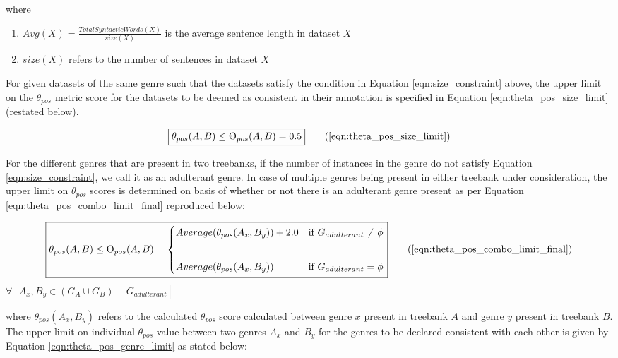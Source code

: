  where

\begin{enumerate}
    \item $Avg(X) = \frac{Total Syntactic Words(X)}{size(X)}$ is the average sentence length in dataset $X$
    \item $size(X)$ refers to the number of sentences in dataset $X$
\end{enumerate}

For given datasets of the same genre such that the datasets satisfy the condition in Equation \ref{eqn:size_constraint} above, the upper limit on the $\theta_{pos}$ metric score for the datasets to be deemed as consistent in their annotation is specified in Equation \ref{eqn:theta_pos_size_limit} (restated below).

\begin{equation}
\boxed{\theta_{pos}(A,B) \leq \Theta_{pos}(A,B) = 0.5}  \tag{\ref{eqn:theta_pos_size_limit}}
\end{equation}

For the different genres that are present in two treebanks, if the number of instances in the genre do not satisfy Equation \ref{eqn:size_constraint}, we call it as an adulterant genre. In case of multiple genres being present in either treebank under consideration, the upper limit on $\theta_{pos}$ scores is determined on basis of whether or not there is an adulterant genre present as per Equation \ref{eqn:theta_pos_combo_limit_final} reproduced below:

\begin{equation}
    \boxed{\theta_{pos}(A, B) \leq \Theta_{pos}(A, B) = \begin{cases}
    Average(\theta_{pos}(A_{x}, B_{y})) + 2.0 & \text{if } G_{adulterant} \neq \phi\\
    \vspace{2mm}\\
    Average(\theta_{pos}(A_{x}, B_{y})) & \text{if } G_{adulterant} = \phi\\
    \end{cases}}
\tag{\ref{eqn:theta_pos_combo_limit_final}}
\end{equation}
\hfill $\forall [A_{x}, B_{y} \in (G_{A} \cup G_{B}) - G_{adulterant}]$

where $\theta_{pos}(A_{x}, B_{y})$ refers to the calculated $\theta_{pos}$ score calculated between genre $x$ present in treebank $A$ and genre $y$ present in treebank $B$. The upper limit on individual $\theta_{pos}$ value between two genres $A_{x}$ and $B_{y}$ for the genres to be declared consistent with each other is given by Equation \ref{eqn:theta_pos_genre_limit} as stated below:


